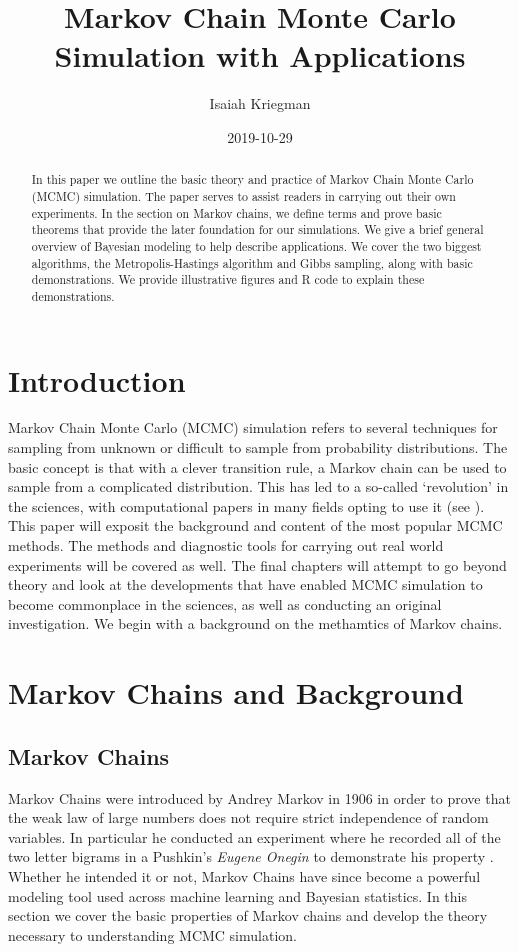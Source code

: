\documentclass[11pt]{amsart}
\title{Markov Chain Monte Carlo Simulation with Applications} %
\author{Isaiah Kriegman}
\date{2019-10-29} %
\theoremstyle{theorem} %
\theoremstyle{definition}                  %
\theoremstyle{example}                       %
\theoremstyle{remark}                       %
\numberwithin{equation}{section}
\begin{document}
\begin{abstract}
    In this paper we outline the basic theory and practice of Markov Chain Monte Carlo (MCMC) simulation. The paper serves to assist readers in carrying out their own experiments. In the section on Markov chains, we define terms and prove basic theorems that provide the later foundation for our simulations. We give a brief general overview of Bayesian modeling to help describe applications. We cover the two biggest algorithms, the Metropolis-Hastings algorithm and Gibbs sampling, along with basic demonstrations. We provide illustrative figures and R code to explain these demonstrations.
\end{abstract}

\maketitle %

\section{Introduction}

Markov Chain Monte Carlo (MCMC) simulation refers to several techniques for sampling from unknown or difficult to sample from probability distributions. The basic concept is that with a clever transition rule, a Markov chain can be used to sample from a complicated distribution. This has led to a so-called `revolution' in the sciences, with computational papers in many fields opting to use it (see \cite{rev}). This paper will exposit the background and content of the most popular MCMC methods. The methods and diagnostic tools for carrying out real world experiments will be covered as well. The final chapters will attempt to go beyond theory and look at the developments that have enabled MCMC simulation to become commonplace in the sciences, as well as conducting an original investigation. We begin with a background on the methamtics of Markov chains.

\section{Markov Chains and Background}

\subsection{Markov Chains}

Markov Chains were introduced by Andrey Markov in 1906 in order to prove that the weak law of large numbers does not require strict independence of random variables. In particular he conducted an experiment where he recorded all of the two letter bigrams in a Pushkin's \emph{Eugene Onegin} to demonstrate his property \cite{pierre}. Whether he intended it or not, Markov Chains have since become a powerful modeling tool used across machine learning and Bayesian statistics. In this section we cover the basic properties of Markov chains and develop the theory necessary to understanding MCMC simulation.
\end{document}
